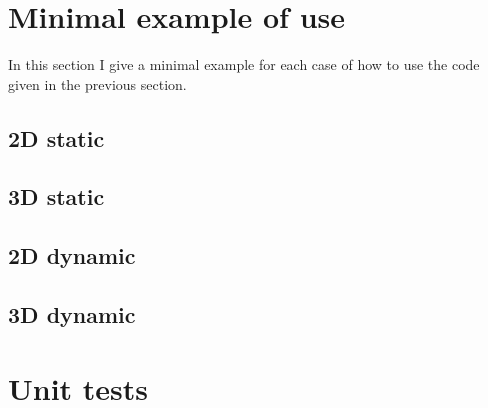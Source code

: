 \documentclass[12pt, a4paper]{article}
\begin{document}
\section{Minimal example of use}

In this section I give a minimal example for each case of how to use the code given in the previous section.

\subsection{2D static}

\begin{scriptsize}
\begin{ttfamily}

\end{ttfamily}
\end{scriptsize}

\subsection{3D static}

\begin{scriptsize}
\begin{ttfamily}

\end{ttfamily}
\end{scriptsize}

\subsection{2D dynamic}

\begin{scriptsize}
\begin{ttfamily}

\end{ttfamily}
\end{scriptsize}

\subsection{3D dynamic}

\begin{scriptsize}
\begin{ttfamily}

\end{ttfamily}
\end{scriptsize}

\section{Unit tests}
\end{document}
